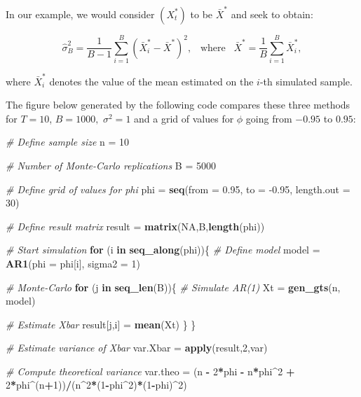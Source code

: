\documentclass[]{book}
\newenvironment{Shaded}{\begin{snugshade}}{\end{snugshade}}
\newcommand{\CommentTok}[1]{\textcolor[rgb]{0.56,0.35,0.01}{\textit{#1}}}
\newcommand{\ControlFlowTok}[1]{\textcolor[rgb]{0.13,0.29,0.53}{\textbf{#1}}}
\newcommand{\DataTypeTok}[1]{\textcolor[rgb]{0.13,0.29,0.53}{#1}}
\newcommand{\DecValTok}[1]{\textcolor[rgb]{0.00,0.00,0.81}{#1}}
\newcommand{\FloatTok}[1]{\textcolor[rgb]{0.00,0.00,0.81}{#1}}
\newcommand{\KeywordTok}[1]{\textcolor[rgb]{0.13,0.29,0.53}{\textbf{#1}}}
\newcommand{\NormalTok}[1]{#1}
\newcommand{\OperatorTok}[1]{\textcolor[rgb]{0.81,0.36,0.00}{\textbf{#1}}}
\newcommand{\OtherTok}[1]{\textcolor[rgb]{0.56,0.35,0.01}{#1}}
\newcommand{\StringTok}[1]{\textcolor[rgb]{0.31,0.60,0.02}{#1}}
\theoremstyle{definition}
\theoremstyle{definition}
\theoremstyle{definition}
\theoremstyle{remark}
\begin{document}
In our example, we would consider \((X_t^*)\) to be \({\bar{X}^*}\) and
seek to obtain:

\[\hat{\sigma}^2_B = \frac{1}{B-1} \sum_{i = 1}^B \left(\bar{X}^*_i - \bar{X}^* \right)^2, \;\;\; \text{where} \;\;\; \bar{X}^* = \frac{1}{B} \sum_{i=1}^B \bar{X}^*_i,\]

where \(\bar{X}^*_i\) denotes the value of the mean estimated on the
\(i\)-th simulated sample.

The figure below generated by the following code compares these three
methods for \(T = 10\), \(B = 1000,\) \(\sigma^2 = 1\) and a grid of
values for \(\phi\) going from \(-0.95\) to \(0.95\):

\begin{Shaded}
\begin{Highlighting}[]
\CommentTok{# Define sample size}
\NormalTok{n =}\StringTok{ }\DecValTok{10}

\CommentTok{# Number of Monte-Carlo replications}
\NormalTok{B =}\StringTok{ }\DecValTok{5000}

\CommentTok{# Define grid of values for phi}
\NormalTok{phi =}\StringTok{ }\KeywordTok{seq}\NormalTok{(}\DataTypeTok{from =} \FloatTok{0.95}\NormalTok{, }\DataTypeTok{to =} \FloatTok{-0.95}\NormalTok{, }\DataTypeTok{length.out =} \DecValTok{30}\NormalTok{)}

\CommentTok{# Define result matrix}
\NormalTok{result =}\StringTok{ }\KeywordTok{matrix}\NormalTok{(}\OtherTok{NA}\NormalTok{,B,}\KeywordTok{length}\NormalTok{(phi))}

\CommentTok{# Start simulation}
\ControlFlowTok{for}\NormalTok{ (i }\ControlFlowTok{in} \KeywordTok{seq_along}\NormalTok{(phi))\{}
  \CommentTok{# Define model}
\NormalTok{  model =}\StringTok{ }\KeywordTok{AR1}\NormalTok{(}\DataTypeTok{phi =}\NormalTok{ phi[i], }\DataTypeTok{sigma2 =} \DecValTok{1}\NormalTok{)}
  
  \CommentTok{# Monte-Carlo}
  \ControlFlowTok{for}\NormalTok{ (j }\ControlFlowTok{in} \KeywordTok{seq_len}\NormalTok{(B))\{}
    \CommentTok{# Simulate AR(1)}
\NormalTok{    Xt =}\StringTok{ }\KeywordTok{gen_gts}\NormalTok{(n, model)}
    
    \CommentTok{# Estimate Xbar}
\NormalTok{    result[j,i] =}\StringTok{ }\KeywordTok{mean}\NormalTok{(Xt)}
\NormalTok{  \}}
\NormalTok{\}}

\CommentTok{# Estimate variance of Xbar}
\NormalTok{var.Xbar =}\StringTok{ }\KeywordTok{apply}\NormalTok{(result,}\DecValTok{2}\NormalTok{,var)}

\CommentTok{# Compute theoretical variance}
\NormalTok{var.theo =}\StringTok{ }\NormalTok{(n }\OperatorTok{-}\StringTok{ }\DecValTok{2}\OperatorTok{*}\NormalTok{phi }\OperatorTok{-}\StringTok{ }\NormalTok{n}\OperatorTok{*}\NormalTok{phi}\OperatorTok{^}\DecValTok{2} \OperatorTok{+}\StringTok{ }\DecValTok{2}\OperatorTok{*}\NormalTok{phi}\OperatorTok{^}\NormalTok{(n}\OperatorTok{+}\DecValTok{1}\NormalTok{))}\OperatorTok{/}\NormalTok{(n}\OperatorTok{^}\DecValTok{2}\OperatorTok{*}\NormalTok{(}\DecValTok{1}\OperatorTok{-}\NormalTok{phi}\OperatorTok{^}\DecValTok{2}\NormalTok{)}\OperatorTok{*}\NormalTok{(}\DecValTok{1}\OperatorTok{-}\NormalTok{phi)}\OperatorTok{^}\DecValTok{2}\NormalTok{)}


\end{Highlighting}
\end{Shaded}
\end{document}
